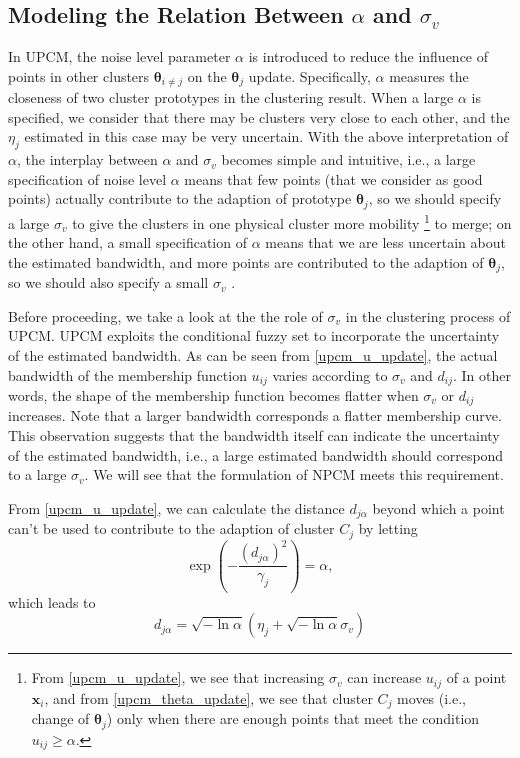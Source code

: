 \documentclass[journal]{IEEEtran}
\theoremstyle{definition}
\begin{document}
\subsection{Modeling the Relation Between $\alpha$ and $\sigma_v$}
\label{sec-3-3}
In UPCM, the noise level parameter $\alpha$ is introduced to reduce the influence of points in other clusters $\boldsymbol{\theta}_{i\neq j}$ on the $\boldsymbol{\theta}_j$ update. Specifically, $\alpha$ measures the closeness of two cluster prototypes in the clustering result. When a large $\alpha$ is specified, we consider that there may be clusters very close to each other, and the $\eta_j$ estimated in this case may be very uncertain. With the above interpretation of $\alpha$, the interplay between $\alpha$ and $\sigma_v$ becomes simple and intuitive, i.e., a large specification of noise level $\alpha$ means that few points (that we consider as good points) actually contribute to the adaption of prototype $\boldsymbol{\theta}_j$, so we should specify a large $\sigma_v$ to give the clusters in one physical cluster more mobility
\footnote{From \eqref{upcm_u_update}, we see that increasing $\sigma_v$ can increase $u_{ij}$ of a point $\mathbf{x}_i$, and from \eqref{upcm_theta_update}, we see that cluster $C_j$ moves (i.e., change of $\boldsymbol{\theta}_j$) only when there are enough points that meet the condition $u_{ij}\geq \alpha$.}
to merge; on the other hand, a small specification of $\alpha$ means that we are less uncertain about the estimated bandwidth, and more points are contributed to the adaption of $\boldsymbol{\theta}_j$, so we should also specify a small $\sigma_v$ \cite{hou_pcm_2016}. 

Before proceeding, we take a look at the the role of $\sigma_v$ in the clustering process of UPCM. UPCM exploits the conditional fuzzy set to incorporate the uncertainty of the estimated bandwidth. As can be seen from \eqref{upcm_u_update}, the actual bandwidth of the membership function $u_{ij}$ varies according to $\sigma_v$ and $d_{ij}$. In other words, the shape of the membership function becomes flatter when $\sigma_v$ or $d_{ij}$ increases. Note that a larger bandwidth corresponds a flatter membership curve. This observation suggests that the bandwidth itself can indicate the uncertainty of the estimated bandwidth, i.e., a large estimated bandwidth should correspond to a large $\sigma_v$. We will see that the formulation of NPCM meets this requirement.

From \eqref{upcm_u_update}, we can calculate the distance $d_{j\alpha}$ beyond which a point can't be used to contribute to the adaption of cluster $C_j$ by letting
\begin{equation}
\exp\left(-\frac{(d_{j\alpha})^2}{\gamma_j}\right)=\alpha,
\end{equation}
which leads to
\begin{equation}
\label{npcm_d_alpha}
d_{j\alpha}=\sqrt{-\ln\alpha}\left(\eta_j+\sqrt{-\ln\alpha}\sigma_v\right)
\end{equation}
\end{document}
